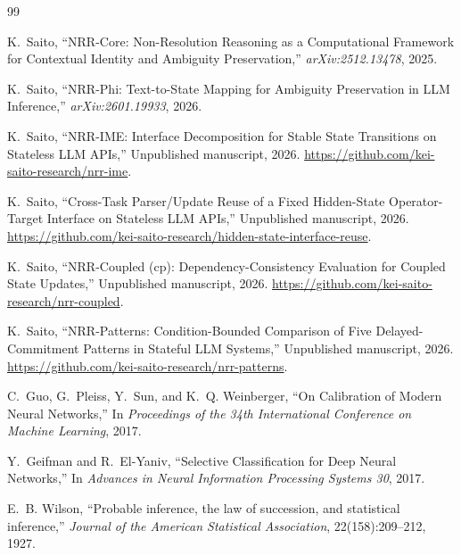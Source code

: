 \documentclass[11pt,a4paper]{article}
\begin{document}
\begin{thebibliography}{99}
\raggedright

K.~Saito,
\newblock ``NRR-Core: Non-Resolution Reasoning as a Computational Framework for Contextual Identity and Ambiguity Preservation,''
\newblock \emph{arXiv:2512.13478}, 2025.

K.~Saito,
\newblock ``NRR-Phi: Text-to-State Mapping for Ambiguity Preservation in LLM Inference,''
\newblock \emph{arXiv:2601.19933}, 2026.

K.~Saito,
\newblock ``NRR-IME: Interface Decomposition for Stable State Transitions on Stateless LLM APIs,''
\newblock Unpublished manuscript, 2026.
\url{https://github.com/kei-saito-research/nrr-ime}.

K.~Saito,
\newblock ``Cross-Task Parser/Update Reuse of a Fixed Hidden-State Operator-Target Interface on Stateless LLM APIs,''
\newblock Unpublished manuscript, 2026.
\url{https://github.com/kei-saito-research/hidden-state-interface-reuse}.

K.~Saito,
\newblock ``NRR-Coupled (cp): Dependency-Consistency Evaluation for Coupled State Updates,''
\newblock Unpublished manuscript, 2026.
\url{https://github.com/kei-saito-research/nrr-coupled}.

K.~Saito,
\newblock ``NRR-Patterns: Condition-Bounded Comparison of Five Delayed-Commitment Patterns in Stateful LLM Systems,''
\newblock Unpublished manuscript, 2026.
\url{https://github.com/kei-saito-research/nrr-patterns}.

C.~Guo, G.~Pleiss, Y.~Sun, and K.~Q. Weinberger,
\newblock ``On Calibration of Modern Neural Networks,''
\newblock In \emph{Proceedings of the 34th International Conference on Machine Learning}, 2017.

Y.~Geifman and R.~El-Yaniv,
\newblock ``Selective Classification for Deep Neural Networks,''
\newblock In \emph{Advances in Neural Information Processing Systems 30}, 2017.

E.~B. Wilson,
\newblock ``Probable inference, the law of succession, and statistical inference,''
\newblock \emph{Journal of the American Statistical Association}, 22(158):209--212, 1927.

\end{thebibliography}
\end{document}
